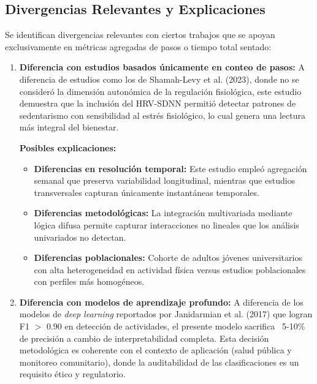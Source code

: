 \subsection{Divergencias Relevantes y Explicaciones}
\label{subsec:divergencias}

Se identifican divergencias relevantes con ciertos trabajos que se apoyan exclusivamente en métricas agregadas de pasos o tiempo total sentado:

\begin{enumerate}
    \item \textbf{Diferencia con estudios basados únicamente en conteo de pasos:} A diferencia de estudios como los de Shamah-Levy et al. (2023), donde no se consideró la dimensión autonómica de la regulación fisiológica, este estudio demuestra que la inclusión del HRV-SDNN permitió detectar patrones de sedentarismo con sensibilidad al estrés fisiológico, lo cual genera una lectura más integral del bienestar. 
    
    \textbf{Posibles explicaciones:}
    \begin{itemize}
        \item \textbf{Diferencias en resolución temporal:} Este estudio empleó agregación semanal que preserva variabilidad longitudinal, mientras que estudios transversales capturan únicamente instantáneas temporales.
        \item \textbf{Diferencias metodológicas:} La integración multivariada mediante lógica difusa permite capturar interacciones no lineales que los análisis univariados no detectan.
        \item \textbf{Diferencias poblacionales:} Cohorte de adultos jóvenes universitarios con alta heterogeneidad en actividad física versus estudios poblacionales con perfiles más homogéneos.
    \end{itemize}
    
    \item \textbf{Diferencia con modelos de aprendizaje profundo:} A diferencia de los modelos de \textit{deep learning} reportados por Janidarmian et al. (2017) que logran F1 $>$ 0.90 en detección de actividades, el presente modelo sacrifica ~5-10\% de precisión a cambio de interpretabilidad completa. Esta decisión metodológica es coherente con el contexto de aplicación (salud pública y monitoreo comunitario), donde la auditabilidad de las clasificaciones es un requisito ético y regulatorio.
\end{enumerate}


